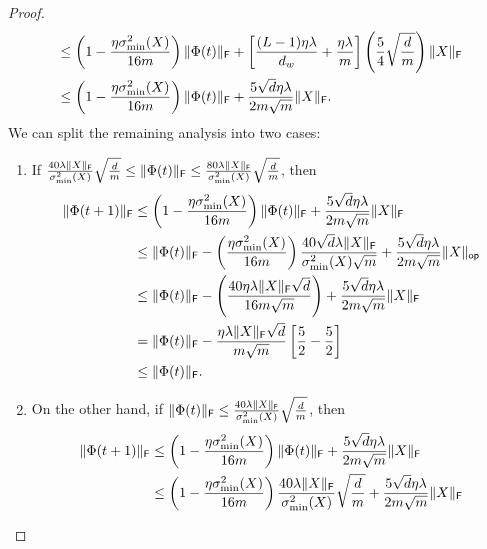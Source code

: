 \begin{proof}
\begin{align*}
    & \leq \left( 1- \frac{\eta \sigma^2_{\min}(X)}{16m} \right)  \lVert\Phi(t)\rVert_{\mathsf{F}} + \left[\frac{(L-1)\eta \lambda}{d_w} +\frac{\eta \lambda}{m} \right] \left(\frac{5}{4}  \sqrt{\frac{d}{m}}  \right) \lVert X\rVert_{\mathsf{F}} \\
   & \leq \left( 1- \frac{\eta \sigma^2_{\min}(X)}{16m} \right)  \lVert\Phi(t)\rVert_{\mathsf{F}} +
   \frac{5 \sqrt{d} \eta \lambda}{2m \sqrt{m}} \lVert X\rVert_{\mathsf{F}}.
\end{align*}
We can split the remaining analysis into two cases:
\begin{enumerate}
  \item If $\frac{40  \lambda \lVert X\rVert_{\mathsf{F}}}{\sigma_{\min}^2(X)} \sqrt{\frac{d}{m}} \leq \lVert\Phi(t)\rVert_{\mathsf{F}} \leq \frac{80  \lambda \lVert X\rVert_{\mathsf{F}}}{\sigma_{\min}^2(X)} \sqrt{\frac{d}{m}}$, then
  \begin{align*}
    \lVert\Phi(t+1)\rVert_{\mathsf{F}} &\leq \left( 1-  \frac{ \eta \sigma^2_{\min}(X)}{16m} \right) \lVert\Phi(t)\rVert_{\mathsf{F}}+ \frac{5  \sqrt{d} \eta \lambda}{2m \sqrt{m}} \lVert X\rVert_{\mathsf{F}}\\
                       &\leq \lVert\Phi(t)\rVert_{\mathsf{F}} -\left( \frac{ \eta \sigma^2_{\min}(X)}{16m} \right)  \frac{40  \sqrt{d}\lambda \lVert X\rVert_{\mathsf{F}}}{ \sigma_{\min}^2(X) \sqrt{m}}
                       + \frac{5  \sqrt{d} \eta \lambda}{2m \sqrt{m}} \lVert X\rVert_{\mathsf{op}}\\
                       &\leq \lVert\Phi(t)\rVert_{\mathsf{F}} -\left( \frac{40 \eta \lambda \lVert X\rVert_{\mathsf{F}} \sqrt{d}}{ 16m \sqrt{m}} \right)  + \frac{5   \sqrt{d} \eta \lambda}{2 m \sqrt{m}} \lVert X\rVert_{\mathsf{F}}\\
      &= \lVert\Phi(t)\rVert_{\mathsf{F}}
      - \frac{\eta \lambda \lVert X\rVert_{\mathsf{F}} \sqrt{d}}{m \sqrt{m}}
      \left[\frac{5}{2}- \frac{5}{2}\right] \\
      & \leq \lVert\Phi(t)\rVert_{\mathsf{F}}.
  \end{align*}
  \item On the other hand, if
  $\lVert\Phi(t)\rVert_{\mathsf{F}} \leq \frac{40 \lambda \lVert X\rVert_{\mathsf{F}}}{\sigma_{\min}^2(X)} \sqrt{\frac{d}{m}}$, then
  \begin{align*}
     \frobnorm{\Phi(t+1)}
      &\leq \left( 1- \frac{\eta \sigma^2_{\min}(X)}{16m} \right) \frobnorm{\Phi(t)} + \frac{5 \sqrt{d} \eta \lambda}{2\din \sqrt{\din}} \frobnorm{X}\\
      &\leq \left( 1- \frac{\eta \sigma^2_{\min}(X)}{16m} \right)
      \frac{40 \lambda \frobnorm{X}}{\sigma_{\min}^2(X)} \sqrt{\frac{\dout}{\din}}
      + \frac{5  \sqrt{d} \eta \lambda}{2\din \sqrt{\din}} \frobnorm{X}\\

\end{align*}
\end{enumerate}
\end{proof}
